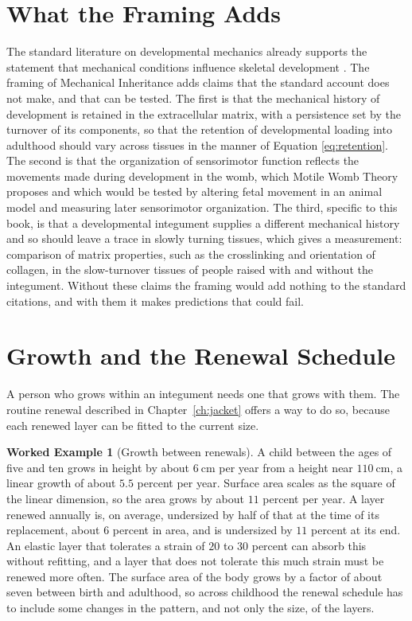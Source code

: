 \documentclass[11pt,openany]{book}
\theoremstyle{definition}
\newtheorem{example}{Worked Example}[chapter]
\theoremstyle{remark}
\begin{document}
\section{What the Framing Adds}

The standard literature on developmental mechanics already supports the statement that mechanical conditions influence skeletal development \cite{pitsillides2006,nowlan2010}. The framing of Mechanical Inheritance adds claims that the standard account does not make, and that can be tested. The first is that the mechanical history of development is retained in the extracellular matrix, with a persistence set by the turnover of its components, so that the retention of developmental loading into adulthood should vary across tissues in the manner of Equation \eqref{eq:retention}. The second is that the organization of sensorimotor function reflects the movements made during development in the womb, which Motile Womb Theory proposes and which would be tested by altering fetal movement in an animal model and measuring later sensorimotor organization. The third, specific to this book, is that a developmental integument supplies a different mechanical history and so should leave a trace in slowly turning tissues, which gives a measurement: comparison of matrix properties, such as the crosslinking and orientation of collagen, in the slow-turnover tissues of people raised with and without the integument. Without these claims the framing would add nothing to the standard citations, and with them it makes predictions that could fail.

\section{Growth and the Renewal Schedule}

A person who grows within an integument needs one that grows with them. The routine renewal described in Chapter~\ref{ch:jacket} offers a way to do so, because each renewed layer can be fitted to the current size.

\begin{example}[Growth between renewals]
\label{ex:growth}
A child between the ages of five and ten grows in height by about $6\ \mathrm{cm}$ per year from a height near $110\ \mathrm{cm}$, a linear growth of about $5.5$ percent per year. Surface area scales as the square of the linear dimension, so the area grows by about $11$ percent per year. A layer renewed annually is, on average, undersized by half of that at the time of its replacement, about $6$ percent in area, and is undersized by $11$ percent at its end. An elastic layer that tolerates a strain of $20$ to $30$ percent can absorb this without refitting, and a layer that does not tolerate this much strain must be renewed more often. The surface area of the body grows by a factor of about seven between birth and adulthood, so across childhood the renewal schedule has to include some changes in the pattern, and not only the size, of the layers.
\end{example}
\end{document}
